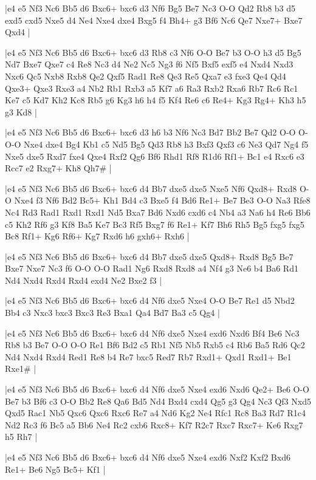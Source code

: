 \whitename{}
\blackname{}
\makegametitle
|e4 e5 Nf3 Nc6 Bb5 d6 Bxc6+ bxc6 d3 Nf6 Bg5 Be7 Nc3 O-O Qd2 Rb8 b3 d5 exd5 cxd5 Nxe5 d4 Ne4 Nxe4 dxe4 Bxg5 f4 Bh4+ g3 Bf6 Nc6 Qe7 Nxe7+ Bxe7 Qxd4  |

\whitename{}
\blackname{}
\makegametitle
|e4 e5 Nf3 Nc6 Bb5 d6 Bxc6+ bxc6 d3 Rb8 c3 Nf6 O-O Be7 b3 O-O h3 d5 Bg5 Nd7 Bxe7 Qxe7 c4 Re8 Nc3 d4 Ne2 Nc5 Ng3 f6 Nf5 Bxf5 exf5 e4 Nxd4 Nxd3 Nxc6 Qc5 Nxb8 Rxb8 Qe2 Qxf5 Rad1 Re8 Qe3 Re5 Qxa7 e3 fxe3 Qe4 Qd4 Qxe3+ Qxe3 Rxe3 a4 Nb2 Rb1 Rxb3 a5 Kf7 a6 Ra3 Rxb2 Rxa6 Rb7 Rc6 Rc1 Ke7 c5 Kd7 Kh2 Kc8 Rb5 g6 Kg3 h6 h4 f5 Kf4 Re6 c6 Re4+ Kg3 Rg4+ Kh3 h5 g3 Kd8  |

\whitename{}
\blackname{}
\makegametitle
|e4 e5 Nf3 Nc6 Bb5 d6 Bxc6+ bxc6 d3 h6 b3 Nf6 Nc3 Bd7 Bb2 Be7 Qd2 O-O O-O-O Nxe4 dxe4 Bg4 Kb1 c5 Nd5 Bg5 Qd3 Rb8 h3 Bxf3 Qxf3 c6 Ne3 Qd7 Ng4 f5 Nxe5 dxe5 Rxd7 fxe4 Qxe4 Rxf2 Qg6 Bf6 Rhd1 Rf8 R1d6 Rf1+ Bc1 e4 Rxc6 e3 Rcc7 e2 Rxg7+ Kh8 Qh7\#  |

\whitename{}
\blackname{}
\makegametitle
|e4 e5 Nf3 Nc6 Bb5 d6 Bxc6+ bxc6 d4 Bb7 dxe5 dxe5 Nxe5 Nf6 Qxd8+ Rxd8 O-O Nxe4 f3 Nf6 Bd2 Bc5+ Kh1 Bd4 c3 Bxe5 f4 Bd6 Re1+ Be7 Be3 O-O Na3 Rfe8 Nc4 Rd3 Rad1 Rxd1 Rxd1 Nd5 Bxa7 Bd6 Nxd6 cxd6 c4 Nb4 a3 Na6 h4 Re6 Bb6 c5 Kh2 Rf6 g3 Kf8 Ba5 Ke7 Bc3 Rf5 Bxg7 f6 Re1+ Kf7 Bh6 Rh5 Bg5 fxg5 fxg5 Bc8 Rf1+ Kg6 Rf6+ Kg7 Rxd6 h6 gxh6+ Rxh6  |

\whitename{}
\blackname{}
\makegametitle
|e4 e5 Nf3 Nc6 Bb5 d6 Bxc6+ bxc6 d4 Bb7 dxe5 dxe5 Qxd8+ Rxd8 Bg5 Be7 Bxe7 Nxe7 Nc3 f6 O-O O-O Rad1 Ng6 Rxd8 Rxd8 a4 Nf4 g3 Ne6 b4 Ba6 Rd1 Nd4 Nxd4 Rxd4 Rxd4 exd4 Ne2 Bxe2 f3  |

\whitename{}
\blackname{}
\makegametitle
|e4 e5 Nf3 Nc6 Bb5 d6 Bxc6+ bxc6 d4 Nf6 dxe5 Nxe4 O-O Be7 Re1 d5 Nbd2 Bb4 c3 Nxc3 bxc3 Bxc3 Re3 Bxa1 Qa4 Bd7 Ba3 c5 Qg4  |

\whitename{}
\blackname{}
\makegametitle
|e4 e5 Nf3 Nc6 Bb5 d6 Bxc6+ bxc6 d4 Nf6 dxe5 Nxe4 exd6 Nxd6 Bf4 Be6 Nc3 Rb8 b3 Be7 O-O O-O Re1 Bf6 Bd2 c5 Rb1 Nf5 Nb5 Rxb5 c4 Rb6 Ba5 Rd6 Qc2 Nd4 Nxd4 Rxd4 Red1 Re8 b4 Re7 bxc5 Red7 Rb7 Rxd1+ Qxd1 Rxd1+ Be1 Rxe1\#  |

\whitename{}
\blackname{}
\makegametitle
|e4 e5 Nf3 Nc6 Bb5 d6 Bxc6+ bxc6 d4 Nf6 dxe5 Nxe4 exd6 Nxd6 Qe2+ Be6 O-O Be7 b3 Bf6 c3 O-O Bb2 Re8 Qa6 Bd5 Nd4 Bxd4 cxd4 Qg5 g3 Qg4 Nc3 Qf3 Nxd5 Qxd5 Rac1 Nb5 Qxc6 Qxc6 Rxc6 Re7 a4 Nd6 Kg2 Ne4 Rfc1 Rc8 Ba3 Rd7 R1c4 Nd2 Rc3 f6 Bc5 a5 Bb6 Ne4 Rc2 cxb6 Rxc8+ Kf7 R2c7 Rxc7 Rxc7+ Ke6 Rxg7 h5 Rh7  |

\whitename{}
\blackname{}
\makegametitle
|e4 e5 Nf3 Nc6 Bb5 d6 Bxc6+ bxc6 d4 Nf6 dxe5 Nxe4 exd6 Nxf2 Kxf2 Bxd6 Re1+ Be6 Ng5 Bc5+ Kf1  |

